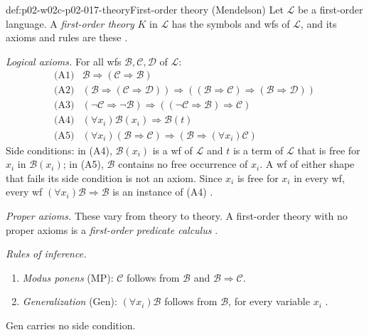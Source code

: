 \begin{hbdefinition}{def:p02-w02c-p02-017-theory}{First-order theory (Mendelson)}
Let \(\mathscr L\) be a first-order language.  A \emph{first-order theory}
\(K\) in \(\mathscr L\) has the symbols and wfs of \(\mathscr L\), and its
axioms and rules are these \cite[\S 2.3, pp.~69--70]{Mendelson1997}.

\emph{Logical axioms.}  For all wfs \(\mathscr B,\mathscr C,\mathscr D\) of
\(\mathscr L\):
\[
\begin{array}{ll}
 \text{(A1)} & \mathscr B\Rightarrow(\mathscr C\Rightarrow\mathscr B)\\
 \text{(A2)} & (\mathscr B\Rightarrow(\mathscr C\Rightarrow\mathscr D))
               \Rightarrow((\mathscr B\Rightarrow\mathscr C)
               \Rightarrow(\mathscr B\Rightarrow\mathscr D))\\
 \text{(A3)} & (\neg\mathscr C\Rightarrow\neg\mathscr B)
               \Rightarrow((\neg\mathscr C\Rightarrow\mathscr B)
               \Rightarrow\mathscr C)\\
 \text{(A4)} & (\forall x_i)\mathscr B(x_i)\Rightarrow\mathscr B(t)\\
 \text{(A5)} & (\forall x_i)(\mathscr B\Rightarrow\mathscr C)
               \Rightarrow(\mathscr B\Rightarrow(\forall x_i)\mathscr C)
\end{array}
\]
Side conditions: in (A4), \(\mathscr B(x_i)\) is a wf of \(\mathscr L\) and
\(t\) is a term of \(\mathscr L\) that is free for \(x_i\) in
\(\mathscr B(x_i)\); in (A5), \(\mathscr B\) contains no free occurrence of
\(x_i\).  A wf of either shape that fails its side condition is not an
axiom.  Since \(x_i\) is free for \(x_i\) in every wf, every wf
\((\forall x_i)\mathscr B\Rightarrow\mathscr B\) is an instance of (A4)
\cite[\S 2.3, p.~69]{Mendelson1997}.

\emph{Proper axioms.}  These vary from theory to theory.  A first-order
theory with no proper axioms is a \emph{first-order predicate calculus}
\cite[\S 2.3, p.~70]{Mendelson1997}.

\emph{Rules of inference.}
\begin{enumerate}
  \item \emph{Modus ponens} (MP): \(\mathscr C\) follows from \(\mathscr B\)
        and \(\mathscr B\Rightarrow\mathscr C\).
  \item \emph{Generalization} (Gen): \((\forall x_i)\mathscr B\) follows
        from \(\mathscr B\), for every variable \(x_i\)
        \cite[\S 2.3, p.~70]{Mendelson1997}.
\end{enumerate}
Gen carries no side condition.
\end{hbdefinition}

